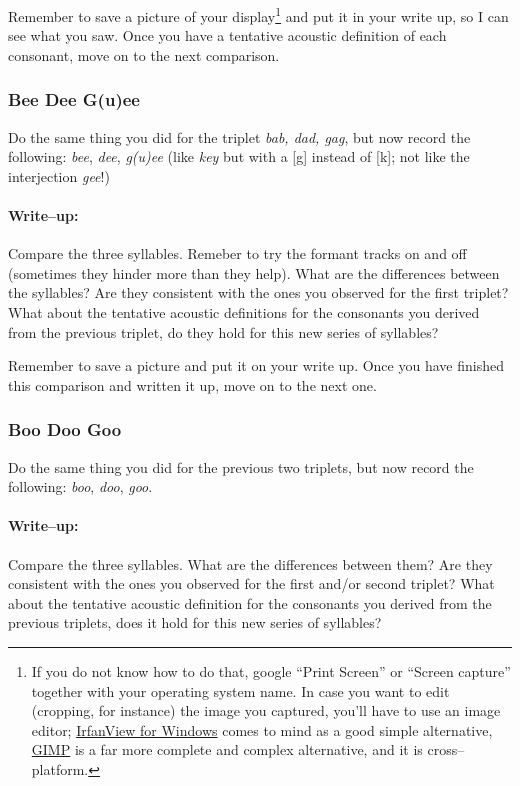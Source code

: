 \documentclass{article}
\begin{document}
Remember to save a picture of your display\footnote{If you do not know how to do that, google ``Print Screen'' or ``Screen capture'' together with your operating system name. In case you want to edit (cropping, for instance) the image you captured, you'll have to use an image editor; \href{http://www.irfanview.com/}{IrfanView for Windows} comes to mind as a good simple alternative, \href{http://www.gimp.org/}{GIMP} is a far more complete and complex alternative, and it is cross--platform.} and put it in your write up, so I can see what you saw. Once you have a tentative acoustic definition of each consonant, move on to the next comparison.

\subsubsection{Bee Dee G(u)ee}

Do the same thing you did for the triplet \emph{bab, dad, gag}, but now record the following: \emph{bee}, \emph{dee}, \emph{g(u)ee} (like \emph{key} but with a [g] instead of [k]; not like the interjection \emph{gee}!)

\paragraph{Write--up:} Compare the three syllables. Remeber to try the formant tracks on and off (sometimes they hinder more than they help). What are the differences between the syllables? Are they consistent with the ones you observed for the first triplet? What about the tentative acoustic definitions for the consonants you derived from the previous triplet, do they hold for this new series of syllables?

Remember to save a picture and put it on your write up. Once you have finished this comparison and written it up, move on to the next one.

\subsubsection{Boo Doo Goo}

Do the same thing you did for the previous two triplets, but now record the following: \emph{boo}, \emph{doo}, \emph{goo}.

\paragraph{Write--up:} Compare the three syllables. What are the differences between them? Are they consistent with the ones you observed for the first and/or second triplet? What about the tentative acoustic definition for the consonants you derived from the previous triplets, does it hold for this new series of syllables?
\end{document}
